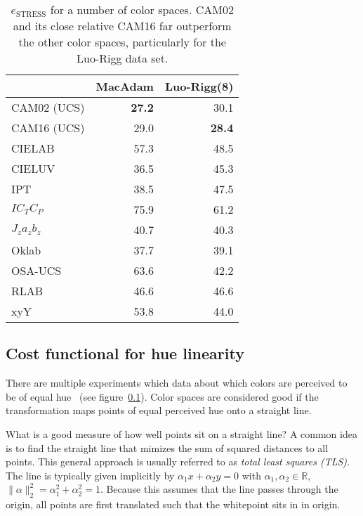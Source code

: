\documentclass{scrartcl}
\theoremstyle{named}
\newcommand\R{\ensuremath{\mathbb{R}}}
\begin{document}
\begin{table}
  \centering
  \begin{tabular}{lrr}
    \toprule
    & MacAdam & Luo-Rigg(8) \cite{luorigg}\\
    \midrule
CAM02 (UCS)   & \textbf{27.2} &         30.1\\
CAM16 (UCS)   &         29.0  & \textbf{28.4}\\
CIELAB        &         57.3  &         48.5\\
CIELUV        &         36.5  &         45.3\\
IPT           &         38.5  &         47.5\\
$IC_TC_P$     &         75.9  &         61.2\\
$J_z a_z b_z$ &         40.7  &         40.3\\
Oklab         &         37.7  &         39.1\\
OSA-UCS       &         63.6  &         42.2\\
RLAB          &         46.6  &         46.6\\
xyY           &         53.8  &         44.0\\
    \bottomrule
  \end{tabular}
  \caption{$e_\text{STRESS}$ for a number of color spaces. CAM02 and its close relative
  CAM16 far outperform the other color spaces, particularly for the Luo-Rigg data set.}
\end{table}

\subsection{Cost functional for hue linearity}

There are multiple experiments which data about which colors are perceived to be of
equal hue~\cite{hung,ebner,xiao} (see figure~\ref{}). Color spaces are considered good
if the transformation maps points of equal perceived hue onto a straight line.

What is a good measure of how well points sit on a straight line?
A common idea is to find the straight line that mimizes the sum of squared distances to
all points. This general approach is usually referred to as \emph{total least squares
(TLS)}.
The line is typically
given implicitly by $\alpha_1 x + \alpha_2 y
= 0$ with $\alpha_1,\alpha_2\in\R$, $\|\alpha\|_2^2 = \alpha_1^2 + \alpha_2^2 = 1$.
Because this assumes that the line passes through the origin, all points are
first translated such that the whitepoint sits in in origin.
\end{document}
